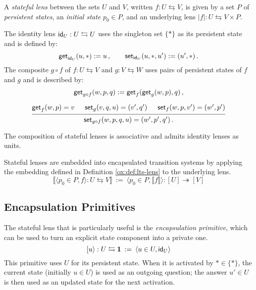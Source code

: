 \begin{definition}
  \label{oe:def:lens-stateful}
  A \emph{stateful lens} between the sets $U$ and $V$,
  written $f : U \leftrightarrows V$,
  is given by a set $P$ of \emph{persistent states},
  an \emph{initial state} $p_0 \in P$,
  and an underlying lens $|f| : U \leftrightarrows V \times P$.

  The identity lens $ \mathsf{id} _U : U \leftrightarrows U$
  uses the singleton set $\{*\}$ as its persistent state and is defined by:
  \[
     \mathsf{get} _{ \mathsf{id} _U}(u, *) := u
    \,,
    \qquad
     \mathsf{set} _{ \mathsf{id} _U}(u, *, u') := (u', *)
    \,.
  \]
  The composite $g \circ f$ of
  $f : U \leftrightarrows V$ and
  $g : V \leftrightarrows W$
  uses pairs of persistent states of $f$ and $g$ and
  is described by:
  \begin{gather*}
    \kw{get}_{g \circ f}(w, p, q) := \kw{get}_f(\kw{get}_g(w, p), q)
    \,,
    \\[1.5ex]
    \begin{prooftree}
      \hypo{\kw{get}_f(w, p) = v}
      \hypo{\kw{set}_g(v, q, u) = (v', q')}
      \hypo{\kw{set}_f(w, p, v') = (w', p')}
      \infer3{\kw{set}_{g \circ f}(w, p, q, u) = (w', p', q') \,.}
    \end{prooftree}
  \end{gather*}
\end{definition}

\begin{theorem}
  The composition of stateful lenses is associative
  and admits identity lenses as units.
\end{theorem}

Stateful lenses
are embedded into encapsulated transition systems
by applying the embedding defined in Definition \ref{ox:def:lts-lens}
to the underlying lens.
\[
  \llbracket \langle p_0 \in P, f \rangle : U \leftrightarrows V \rrbracket
  \::=\:
  \langle p_0 \in P, \llbracket f \rrbracket \rangle : [U] \twoheadrightarrow [V]
\]

\subsection{Encapsulation Primitives}
\label{sec:oe:encap-primitive}

The stateful lens that is particularly useful
is the \emph{encapsulation primitive},
which can be used to turn
an explicit state component into a private one.
\[
  [ {u} \rangle : U \leftrightarrows \mathbf{1} \::=\: \langle u \in U,  \mathsf{id} _U \rangle
\]
This primitive uses $U$ for its persistent state.
When it is activated by $* \in \{*\}$,
the current state (initially $u \in U$)
is used as an outgoing question;
the answer $u' \in U$ is then used as an updated state for the next activation.

